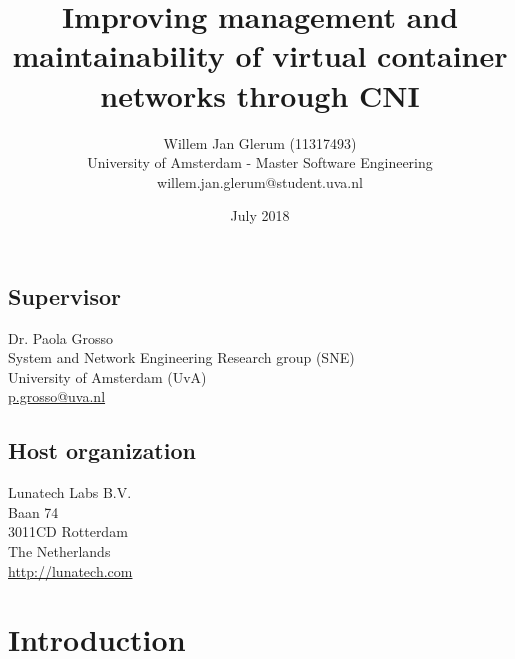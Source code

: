 \documentclass{article}
\title{Improving management and maintainability of virtual container networks through CNI}
\author{Willem Jan Glerum (11317493)
\\ University of Amsterdam - Master Software Engineering
\\willem.jan.glerum@student.uva.nl}
\date{July 2018}
\begin{document}
\maketitle


\newpage

\subsection*{Supervisor}
Dr. Paola Grosso\\
System and Network Engineering Research group (SNE)\\
University of Amsterdam (UvA)\\
\url{p.grosso@uva.nl}

\subsection*{Host organization}
Lunatech Labs B.V.\\
Baan 74\\
3011CD Rotterdam\\
The Netherlands\\
\url{http://lunatech.com}

\newpage
\tableofcontents
\newpage

\section{Introduction}


\printbibliography
\end{document}
